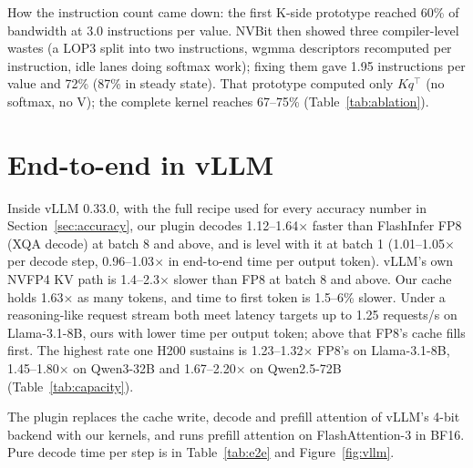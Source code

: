 \documentclass[11pt]{article}
\begin{document}
How the instruction count came down: the first K-side prototype reached 60\% of bandwidth at 3.0 instructions per value. NVBit then showed three compiler-level wastes (a LOP3 split into two instructions, wgmma descriptors recomputed per instruction, idle lanes doing softmax work); fixing them gave 1.95 instructions per value and 72\% (87\% in steady state). That prototype computed only $K q^\top$ (no softmax, no V); the complete kernel reaches 67--75\% (Table~\ref{tab:ablation}).

\section{End-to-end in vLLM}
\label{sec:e2e}

Inside vLLM 0.33.0, with the full recipe used for every accuracy number in Section~\ref{sec:accuracy}, our plugin decodes 1.12--1.64$\times$ faster than FlashInfer FP8 (XQA decode) at batch 8 and above, and is level with it at batch 1 (1.01--1.05$\times$ per decode step, 0.96--1.03$\times$ in end-to-end time per output token). vLLM's own NVFP4 KV path is 1.4--2.3$\times$ slower than FP8 at batch 8 and above. Our cache holds 1.63$\times$ as many tokens, and time to first token is 1.5--6\% slower. Under a reasoning-like request stream both meet latency targets up to 1.25 requests/s on Llama-3.1-8B, ours with lower time per output token; above that FP8's cache fills first. The highest rate one H200 sustains is 1.23--1.32$\times$ FP8's on Llama-3.1-8B, 1.45--1.80$\times$ on Qwen3-32B and 1.67--2.20$\times$ on Qwen2.5-72B (Table~\ref{tab:capacity}).

The plugin replaces the cache write, decode and prefill attention of vLLM's 4-bit backend with our kernels, and runs prefill attention on FlashAttention-3 in BF16. Pure decode time per step is in Table~\ref{tab:e2e} and Figure~\ref{fig:vllm}.
\end{document}

